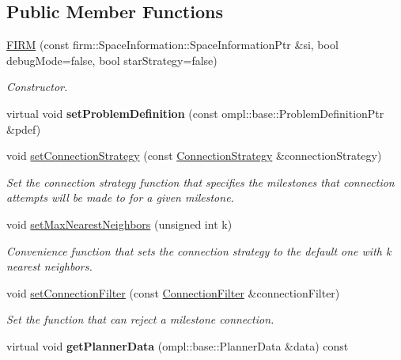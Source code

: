 \subsection*{\-Public \-Member \-Functions}
\begin{DoxyCompactItemize}
\item 
\hypertarget{class_f_i_r_m_a45dfdcb347763c633bf46ee653c35ce9}{\hyperlink{class_f_i_r_m_a45dfdcb347763c633bf46ee653c35ce9}{\-F\-I\-R\-M} (const firm\-::\-Space\-Information\-::\-Space\-Information\-Ptr \&si, bool debug\-Mode=false, bool star\-Strategy=false)}\label{class_f_i_r_m_a45dfdcb347763c633bf46ee653c35ce9}

\begin{DoxyCompactList}\small\item\em \-Constructor. \end{DoxyCompactList}\item 
\hypertarget{class_f_i_r_m_a09a7ff97d8202a82ca7f6dddfd7ba185}{virtual void {\bfseries set\-Problem\-Definition} (const ompl\-::base\-::\-Problem\-Definition\-Ptr \&pdef)}\label{class_f_i_r_m_a09a7ff97d8202a82ca7f6dddfd7ba185}

\item 
void \hyperlink{class_f_i_r_m_a8017d1847e682f39c2cbce33e904af57}{set\-Connection\-Strategy} (const \hyperlink{class_f_i_r_m_a15cfbcaf52c0bdd5e6c1a969bbf7ea1e}{\-Connection\-Strategy} \&connection\-Strategy)
\begin{DoxyCompactList}\small\item\em \-Set the connection strategy function that specifies the milestones that connection attempts will be made to for a given milestone. \end{DoxyCompactList}\item 
\hypertarget{class_f_i_r_m_a2a87b6c094c21b956a469a2b69cd387c}{void \hyperlink{class_f_i_r_m_a2a87b6c094c21b956a469a2b69cd387c}{set\-Max\-Nearest\-Neighbors} (unsigned int k)}\label{class_f_i_r_m_a2a87b6c094c21b956a469a2b69cd387c}

\begin{DoxyCompactList}\small\item\em \-Convenience function that sets the connection strategy to the default one with k nearest neighbors. \end{DoxyCompactList}\item 
void \hyperlink{class_f_i_r_m_a3f85ba51a7c3b62b75df7f7c16064cec}{set\-Connection\-Filter} (const \hyperlink{class_f_i_r_m_a2482eee2e5248d5bff3b3b56e5a593b3}{\-Connection\-Filter} \&connection\-Filter)
\begin{DoxyCompactList}\small\item\em \-Set the function that can reject a milestone connection. \end{DoxyCompactList}\item 
\hypertarget{class_f_i_r_m_aedf1364d36f3934d5e47656a6d8e7d65}{virtual void {\bfseries get\-Planner\-Data} (ompl\-::base\-::\-Planner\-Data \&data) const }\label{class_f_i_r_m_aedf1364d36f3934d5e47656a6d8e7d65}


\end{DoxyCompactItemize}
